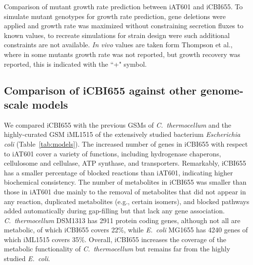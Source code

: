 \begin{table}[h]
    \caption[Comparison of mutant growth rate prediction between iAT601 and iCBI655 models]{Comparison of mutant growth rate prediction between iAT601 and iCBI655. To simulate mutant genotypes for growth rate prediction, gene deletions were applied and growth rate was maximized without constraining secretion fluxes to known values, to recreate simulations for strain design were such additional constraints are not available. \textit{In vivo} values are taken form Thompson et al.\citep{thompson2015}, where in some mutants growth rate was not reported, but growth recovery was reported, this is indicated with the ``+" symbol.}
    \centering
    
    \label{tab:mutants}
\end{table}



\subsection{Comparison of iCBI655 against other genome-scale models}
We compared iCBI655 with the previous GSMs of \textit{C.~thermocellum} and the highly-curated GSM iML1515 of the extensively studied bacterium \textit{Escherichia coli} (Table~\ref{tab:models}).
The increased number of genes in iCBI655 with respect to iAT601 cover a variety of functions, including hydrogenase chaperons, cellulosome and cellulase, ATP synthase, and transporters.
Remarkably, iCBI655 has a smaller percentage of blocked reactions than iAT601, indicating higher biochemical consistency. The number of metabolites in iCBI655 was smaller than those in iAT601 due mainly to the removal of metabolites that did not appear in any reaction, duplicated metabolites (e.g., certain isomers), and blocked pathways added automatically during gap-filling but that lack any gene association. \textit{C.~thermocellum} DSM1313 has 2911 protein coding genes, although not all are metabolic, of which iCBI655 covers 22\%, while \textit{E.~coli} MG1655 has 4240 genes of which iML1515 covers 35\%. Overall, iCBI655 increases the coverage of the metabolic functionality of \textit{C.~thermocellum} but remains far from the highly studied \textit{E.~coli}.


